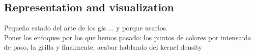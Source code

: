 \newpage
\subsection{Representation and visualization}

Pequeño estado del arte de los gis ... y porque usarlos.
\\
Poner los enfoques por los que hemos pasado: los puntos de colores por intensaida de paso, la grilla y finalmente, acabar hablando del kernel density